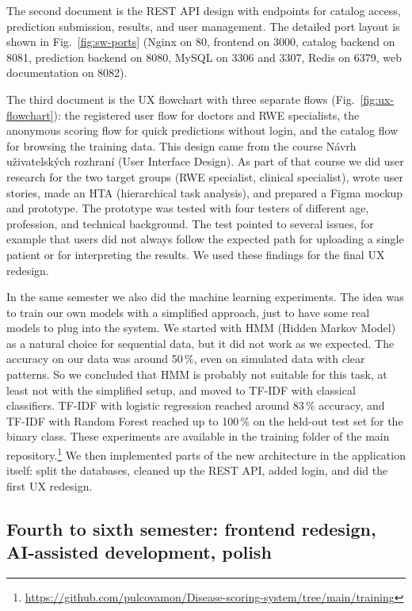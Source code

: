 The second document is the REST API design with endpoints for catalog access, prediction submission, results, and user management. The detailed port layout is shown in Fig.~\ref{fig:sw-ports} (Nginx on 80, frontend on 3000, catalog backend on 8081, prediction backend on 8080, MySQL on 3306 and 3307, Redis on 6379, web documentation on 8082).

The third document is the UX flowchart with three separate flows (Fig.~\ref{fig:ux-flowchart}): the registered user flow for doctors and RWE specialists, the anonymous scoring flow for quick predictions without login, and the catalog flow for browsing the training data. This design came from the course Návrh uživatelských rozhraní (User Interface Design). As part of that course we did user research for the two target groups (RWE specialist, clinical specialist), wrote user stories, made an HTA (hierarchical task analysis), and prepared a Figma mockup and prototype. The prototype was tested with four testers of different age, profession, and technical background. The test pointed to several issues, for example that users did not always follow the expected path for uploading a single patient or for interpreting the results. We used these findings for the final UX redesign.

In the same semester we also did the machine learning experiments. The idea was to train our own models with a simplified approach, just to have some real models to plug into the system. We started with HMM (Hidden Markov Model) as a natural choice for sequential data, but it did not work as we expected. The accuracy on our data was around 50\,\%, even on simulated data with clear patterns. So we concluded that HMM is probably not suitable for this task, at least not with the simplified setup, and moved to TF-IDF with classical classifiers. TF-IDF with logistic regression reached around 83\,\% accuracy, and TF-IDF with Random Forest reached up to 100\,\% on the held-out test set for the binary class. These experiments are available in the training folder of the main repository.\footnote{\url{https://github.com/pulcovamon/Disease-scoring-system/tree/main/training}} We then implemented parts of the new architecture in the application itself: split the databases, cleaned up the REST API, added login, and did the first UX redesign.

\subsection{Fourth to sixth semester: frontend redesign, AI-assisted development, polish}
\label{sec:results-timeline-s456}


